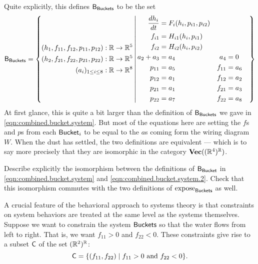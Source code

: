 \documentclass[DynamicalBook]{subfiles}
\begin{document}
Quite explicitly, this defines $\mathsf{B}_{\mathsf{Buckets}}$ to be the set
\begin{equation} \label{eqn:combined.bucket.system.2}
\mathsf{B}_{\mathsf{Buckets}} = \left\{ \begin{aligned} (h_1, f_{11}, f_{12}, p_{11}, p_{12}) &: \mathbb{R} \to \mathbb{R}^5\\
      (h_2, f_{21}, f_{22}, p_{21}, p_{22}) &: \mathbb{R} \to \mathbb{R}^5\\ (a_i)_{1 \leq i
        \leq 8} &: \mathbb{R} \to \mathbb{R}^8 \end{aligned} \,
  \middle|\, \begin{aligned}\frac{dh_i}{dt} &= F_i(h_i, p_{i1}, p_{i2}) \\
  f_{i1} &= H_{i1}(h_i, p_{i1})\\
  f_{i2} &= H_{i2}(h_i, p_{i2})\\
        a_2 + a_3 &= a_4 &
        a_4 &= 0\\
        p_{11} &= a_5  &
        f_{11} &= a_6 \\
        p_{12} &= a_1  &
        f_{12} &= a_2 \\
        p_{21} &= a_1  &
        f_{21} &= a_3 \\
        p_{22} &= a_7  &
        f_{22} &= a_8
\end{aligned} \right\}
\end{equation}
At first glance, this is quite a bit larger than the definition of
$\mathsf{B}_{\mathsf{Buckets}}$ we gave in \cref{eqn:combined.bucket.system}. But most
of the equations here are setting the $f$s and $p$s from each $\mathsf{Bucket}_i$
to be equal to the $a$s coming form the wiring diagram $W$. When the dust has
settled, the two definitions are equivalent --- which is to say more precisely
that they are isomorphic in the category $\textbf{Vec}((\mathbb{R}^4)^{\mathbb{R}})$.

\begin{exercise}
  Describe explicitly the isomorphism between the definitions of
  $\mathsf{B}_{\mathsf{Bucket}}$ in \cref{eqn:combined.bucket.system} and
  \cref{eqn:combined.bucket.system.2}. Check that this isomorphism commutes with
  the two definitions of $\mathrm{expose}_{\mathsf{Buckets}}$ as well.
\end{exercise}

A crucial feature of the behavioral approach to systems theory is that
constraints on system behaviors are treated at the same level as the systems
themselves. Suppose we want to constrain the system $\mathsf{Buckets}$ so that the
water flows from left to right. That is, we want $f_{11} > 0$ and $f_{22} < 0$.
These constraints give rise to a subset $\mathsf{C}$ of the set
$(\mathbb{R}^2)^{\mathbb{R}}$:
\begin{equation}\label{eqn:constraints.ex}
\mathsf{C} = \{ (f_{11}, f_{22}) \mid f_{11} > 0 \mbox{ and } f_{22} < 0 \}.
\end{equation}
\end{document}
